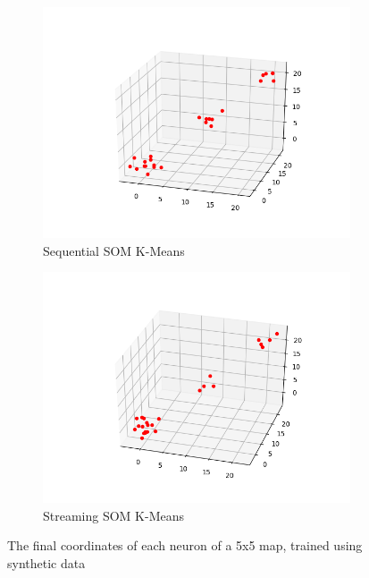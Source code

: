 \documentclass{l4proj}
\begin{document}
\begin{figure}[H]
\label{som-synth}
\begin{subfigure}{.5\textwidth}
  \includegraphics[width=0.95\linewidth]{images/result14}
  \caption{Sequential SOM K-Means}
  \label{fig:res14}
\end{subfigure}%
\begin{subfigure}{.5\textwidth}
  \includegraphics[width=0.95\linewidth]{images/result15}
  \caption{Streaming SOM K-Means}
  \label{fig:res15}
\end{subfigure}
\caption{The final coordinates of each neuron of a 5x5 map, trained using synthetic data}
\end{figure}
\end{document}
